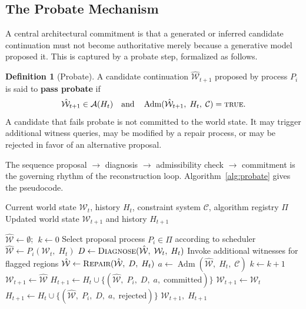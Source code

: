 \documentclass[12pt,a4paper]{article}
\theoremstyle{plain}
\theoremstyle{definition}
\newtheorem{definition}[theorem]{Definition}
\theoremstyle{remark}
\DeclareMathOperator{\Adm}{Adm}
\begin{document}
\subsection{The Probate Mechanism}

A central architectural commitment is that a generated or inferred candidate continuation must not become authoritative merely because a generative model proposed it. This is captured by a probate step, formalized as follows.

\begin{definition}[Probate]
A candidate continuation $\hat{\mathcal{W}}_{t+1}$ proposed by process $P_i$ is said to \textbf{pass probate} if
\[
\hat{\mathcal{W}}_{t+1} \in \mathcal{A}(H_t) \quad \text{and} \quad \Adm(\hat{\mathcal{W}}_{t+1},\; H_t,\; \mathcal{C}) = \textsc{true}.
\]
A candidate that fails probate is not committed to the world state. It may trigger additional witness queries, may be modified by a repair process, or may be rejected in favor of an alternative proposal.
\end{definition}

The sequence proposal $\to$ diagnosis $\to$ admissibility check $\to$ commitment is the governing rhythm of the reconstruction loop. Algorithm~\ref{alg:probate} gives the pseudocode.

\begin{algorithm}[h]
\caption{Probate Loop for World State Continuation}
\label{alg:probate}
\begin{algorithmic}[1]
\Require Current world state $\mathcal{W}_t$, history $H_t$, constraint system $\mathcal{C}$, algorithm registry $\Pi$
\Ensure Updated world state $\mathcal{W}_{t+1}$ and history $H_{t+1}$

\State $\hat{\mathcal{W}} \gets \emptyset$; $\;k \gets 0$
    \State Select proposal process $P_i \in \Pi$ according to scheduler
    \State $\hat{\mathcal{W}} \gets P_i(\mathcal{W}_t,\; H_t)$ 
    \State $D \gets \textsc{Diagnose}(\hat{\mathcal{W}},\; \mathcal{W}_t,\; H_t)$ 
        \State Invoke additional witnesses for flagged regions 
        \State $\hat{\mathcal{W}} \gets \textsc{Repair}(\hat{\mathcal{W}},\; D,\; H_t)$ 
    \EndIf
    \State $a \gets \Adm(\hat{\mathcal{W}},\; H_t,\; \mathcal{C})$ 
    \State $k \gets k + 1$
\EndWhile
{}
    \State $\mathcal{W}_{t+1} \gets \hat{\mathcal{W}}$
    \State $H_{t+1} \gets H_t \cup \{(\hat{\mathcal{W}},\; P_i,\; D,\; a,\; \text{committed})\}$ 
\Else
    \State $\mathcal{W}_{t+1} \gets \mathcal{W}_t$ 
    \State $H_{t+1} \gets H_t \cup \{(\hat{\mathcal{W}},\; P_i,\; D,\; a,\; \text{rejected})\}$
\EndIf
\State \Return $\mathcal{W}_{t+1},\; H_{t+1}$
\end{algorithmic}
\end{algorithm}
\end{document}
